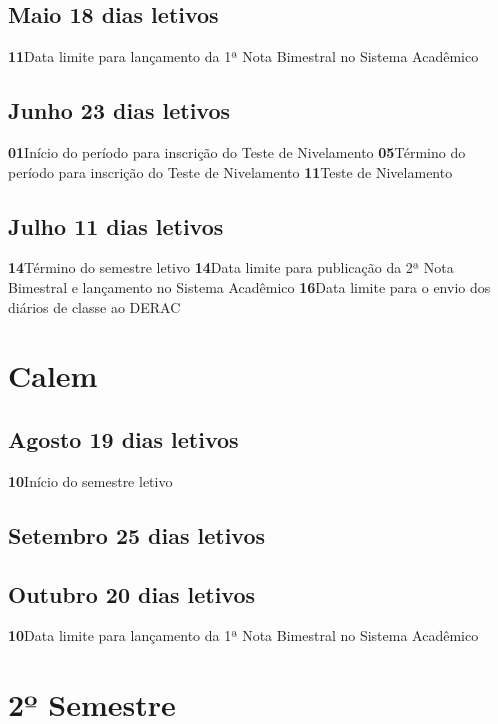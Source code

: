 \documentclass[thesis]{hmcposter}
\begin{document}
\begin{poster}
								\subsection{Maio \hfill 18 dias letivos}\textbf{11}\qquad Data limite para lançamento da 1ª Nota Bimestral no Sistema Acadêmico \newline \null\subsection{Junho \hfill 23 dias letivos}\textbf{01}\qquad Início do período para inscrição do Teste de Nivelamento \newline \null\textbf{05}\qquad Término do período para inscrição do Teste de Nivelamento \newline \null\textbf{11}\qquad Teste de Nivelamento \newline \null\subsection{Julho \hfill 11 dias letivos}\textbf{14}\qquad Término do semestre letivo \newline \null\textbf{14}\qquad Data limite para publicação da 2ª Nota Bimestral e lançamento no Sistema Acadêmico \newline \null\textbf{16}\qquad Data limite para o envio dos diários de classe ao DERAC \newline \null\newpage
\section{\color{hmcorange}Calem}\subsection{Agosto \hfill 19 dias letivos}\textbf{10}\qquad Início do semestre letivo \newline \null\subsection{Setembro \hfill 25 dias letivos}\subsection{Outubro \hfill 20 dias letivos}\textbf{10}\qquad Data limite para lançamento da 1ª Nota Bimestral no Sistema Acadêmico \newline \null\vfill\null
\columnbreak
\section{\hfill \color{hmcorange}2º Semestre}

\end{poster}
\end{document}
